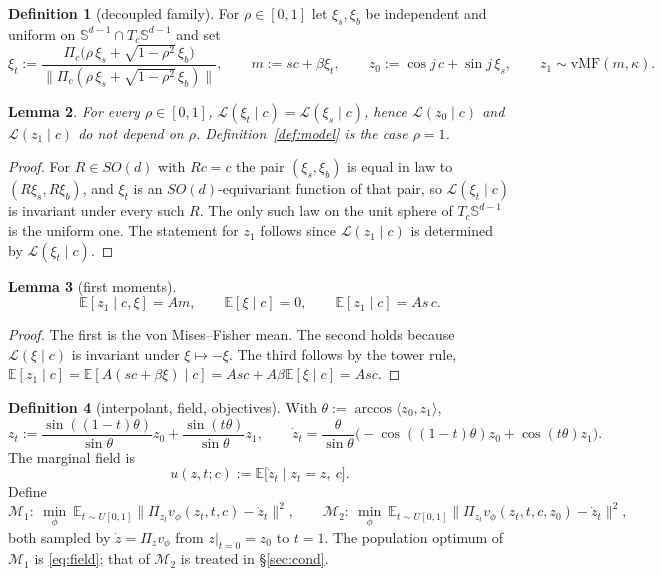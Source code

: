 \documentclass[11pt]{article}
\newtheorem{lemma}{Lemma}[section]
\theoremstyle{definition}
\newtheorem{definition}[lemma]{Definition}
\theoremstyle{remark}
\newcommand{\Sph}{\mathbb{S}^{d-1}}
\newcommand{\E}{\mathbb{E}}
\newcommand{\law}{\mathcal{L}}
\begin{document}
\begin{definition}[decoupled family]\label{def:rho}
For $\rho\in[0,1]$ let $\xi_s,\xi_b$ be independent and uniform on $\Sph\cap T_c\Sph$ and set
\[
\xi_t:=\frac{\Pi_c\big(\rho\,\xi_s+\sqrt{1-\rho^{2}}\,\xi_b\big)}
{\|\Pi_c(\rho\,\xi_s+\sqrt{1-\rho^{2}}\,\xi_b)\|},
\qquad
m:=s c+\beta\xi_t,
\qquad
z_0:=\cos j\,c+\sin j\,\xi_s,
\qquad
z_1\sim\mathrm{vMF}(m,\kappa).
\]
\end{definition}

\begin{lemma}\label{lem:rhomarg}
For every $\rho\in[0,1]$, $\law(\xi_t\mid c)=\law(\xi_s\mid c)$, hence $\law(z_0\mid c)$ and
$\law(z_1\mid c)$ do not depend on $\rho$. Definition~\ref{def:model} is the case $\rho=1$.
\end{lemma}

\begin{proof}
For $R\in SO(d)$ with $Rc=c$ the pair $(\xi_s,\xi_b)$ is equal in law to $(R\xi_s,R\xi_b)$, and
$\xi_t$ is an $SO(d)$-equivariant function of that pair, so $\law(\xi_t\mid c)$ is invariant under
every such $R$. The only such law on the unit sphere of $T_c\Sph$ is the uniform one. The
statement for $z_1$ follows since $\law(z_1\mid c)$ is determined by $\law(\xi_t\mid c)$.
\end{proof}

\begin{lemma}[first moments]\label{lem:moments}
\begin{equation}\label{eq:m1}
\E[z_1\mid c,\xi]=Am,
\qquad
\E[\xi\mid c]=0,
\qquad
\E[z_1\mid c]=As\,c.
\end{equation}
\end{lemma}

\begin{proof}
The first is the von Mises--Fisher mean. The second holds because $\law(\xi\mid c)$ is invariant
under $\xi\mapsto-\xi$. The third follows by the tower rule,
$\E[z_1\mid c]=\E[A(sc+\beta\xi)\mid c]=Asc+A\beta\E[\xi\mid c]=Asc$.
\end{proof}

\begin{definition}[interpolant, field, objectives]\label{def:flow}
With $\theta:=\arccos\langle z_0,z_1\rangle$,
\[
z_t:=\frac{\sin((1-t)\theta)}{\sin\theta}z_0+\frac{\sin(t\theta)}{\sin\theta}z_1,
\qquad
\dot z_t=\frac{\theta}{\sin\theta}\Big(-\cos((1-t)\theta)z_0+\cos(t\theta)z_1\Big).
\]
The marginal field is
\begin{equation}\label{eq:field}
u(z,t;c):=\E\big[\dot z_t\mid z_t=z,\ c\big].
\end{equation}
Define
\[
\mathcal M_1:\ \min_{\phi}\ \E_{t\sim U[0,1]}\big\|\Pi_{z_t}v_\phi(z_t,t,c)-\dot z_t\big\|^{2},
\qquad
\mathcal M_2:\ \min_{\phi}\ \E_{t\sim U[0,1]}\big\|\Pi_{z_t}v_\phi(z_t,t,c,z_0)-\dot z_t\big\|^{2},
\]
both sampled by $\dot z=\Pi_zv_\phi$ from $z|_{t=0}=z_0$ to $t=1$. The population optimum of
$\mathcal M_1$ is \eqref{eq:field}; that of $\mathcal M_2$ is treated in \S\ref{sec:cond}.
\end{definition}
\end{document}
